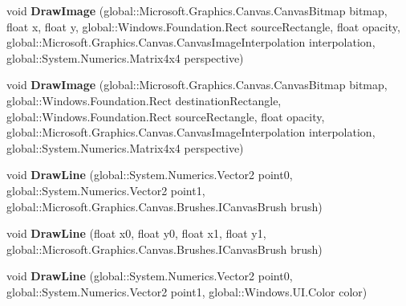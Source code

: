 \begin{DoxyCompactItemize}
void {\bfseries Draw\+Image} (global\+::\+Microsoft.\+Graphics.\+Canvas.\+Canvas\+Bitmap bitmap, float x, float y, global\+::\+Windows.\+Foundation.\+Rect source\+Rectangle, float opacity, global\+::\+Microsoft.\+Graphics.\+Canvas.\+Canvas\+Image\+Interpolation interpolation, global\+::\+System.\+Numerics.\+Matrix4x4 perspective)
\item 
\mbox{\label{interface_microsoft_1_1_graphics_1_1_canvas_1_1_i_canvas_drawing_session_a7a0435e8e3e350ce01e58979f448a53d}} 
void {\bfseries Draw\+Image} (global\+::\+Microsoft.\+Graphics.\+Canvas.\+Canvas\+Bitmap bitmap, global\+::\+Windows.\+Foundation.\+Rect destination\+Rectangle, global\+::\+Windows.\+Foundation.\+Rect source\+Rectangle, float opacity, global\+::\+Microsoft.\+Graphics.\+Canvas.\+Canvas\+Image\+Interpolation interpolation, global\+::\+System.\+Numerics.\+Matrix4x4 perspective)
\item 
\mbox{\label{interface_microsoft_1_1_graphics_1_1_canvas_1_1_i_canvas_drawing_session_a5873fbca4b82b0953078150102fb9000}} 
void {\bfseries Draw\+Line} (global\+::\+System.\+Numerics.\+Vector2 point0, global\+::\+System.\+Numerics.\+Vector2 point1, global\+::\+Microsoft.\+Graphics.\+Canvas.\+Brushes.\+I\+Canvas\+Brush brush)
\item 
\mbox{\label{interface_microsoft_1_1_graphics_1_1_canvas_1_1_i_canvas_drawing_session_acf7fd73b7fc5a481b09e3ea4d14d4d59}} 
void {\bfseries Draw\+Line} (float x0, float y0, float x1, float y1, global\+::\+Microsoft.\+Graphics.\+Canvas.\+Brushes.\+I\+Canvas\+Brush brush)
\item 
\mbox{\label{interface_microsoft_1_1_graphics_1_1_canvas_1_1_i_canvas_drawing_session_a1c018d3317970310c6e9cdb533cae0c6}} 
void {\bfseries Draw\+Line} (global\+::\+System.\+Numerics.\+Vector2 point0, global\+::\+System.\+Numerics.\+Vector2 point1, global\+::\+Windows.\+U\+I.\+Color color)
\item 
\mbox{\label{interface_microsoft_1_1_graphics_1_1_canvas_1_1_i_canvas_drawing_session_a0c0cbe814b2c9574addc8f75b90e3cdf}} 

\end{DoxyCompactItemize}
